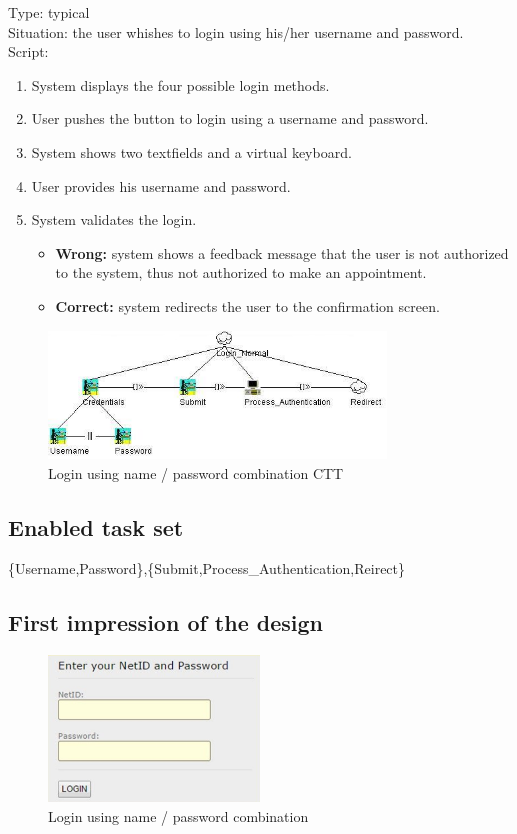 \documentclass[11pt, a4paper,svglistings]{report}
\begin{document}
Type: typical \\
Situation: the user whishes to login using his/her username and password. \\
Script:
\begin{enumerate}
\item System displays the four possible login methods.
\item User pushes the button to login using a username and password.
\item System shows two textfields and a virtual keyboard.
\item User provides his username and password.
\item System validates the login.
\begin{itemize}
\item \textbf{Wrong:} system shows a feedback message that the user is not authorized to the system, thus not authorized to make an appointment.
\item \textbf{Correct:} system redirects the user to the  confirmation screen.
\end{itemize}
\end{enumerate}

\begin{figure}[H]
\centering
    \includegraphics[width=0.8\textwidth]{LoginUsernamePass.png}
  \caption[Username / password CTT]{\label{fig:Logout}Login using name / password combination CTT}
\end{figure}

\subsection{Enabled task set}

\{Username,Password\},\{Submit,Process\_Authentication,Reirect\}

\subsection{First impression of the design}

\begin{figure}[H]
\centering
    \includegraphics[width=0.5\textwidth]{LoginNoKeyboard.jpg}
  \caption[Login screen]{\label{fig:Login}Login using name / password combination}
\end{figure}
\end{document}

